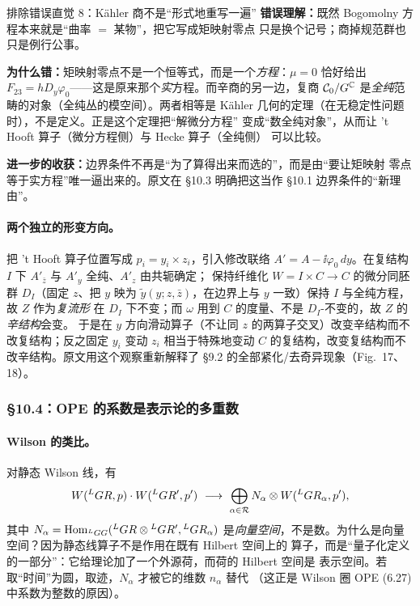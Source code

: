 \begin{kcard}{排除错误直觉 8：Kähler 商不是“形式地重写一遍”}
\textbf{错误理解：}既然 Bogomolny 方程本来就是“曲率 $=$ 某物”，把它写成矩映射零点
只是换个记号；商掉规范群也只是例行公事。

\textbf{为什么错：}矩映射零点不是一个恒等式，而是一个\emph{方程}：$\mu=0$ 恰好给出
$F_{23}=hD_y\varphi_0$——这是原来那个\emph{实}方程。而辛商的另一边，复商
$\mathcal{C}_0/G^{\mathbb{C}}$ 是\emph{全纯}范畴的对象（全纯丛的模空间）。两者相等是
Kähler 几何的定理（在无稳定性问题时），不是定义。正是这个定理把“解微分方程”
变成“数全纯对象”，从而让 't Hooft{} 算子（微分方程侧）与 Hecke 算子（全纯侧）
可以比较。\pA{}

\textbf{进一步的收获：}边界条件不再是“为了算得出来而选的”，而是由“要让矩映射
零点等于实方程”唯一逼出来的。原文在 §10.3 明确把这当作 §10.1 边界条件的“新理由”。
\end{kcard}

\paragraph{两个独立的形变方向。}把 't Hooft{} 算子位置写成 $p_i=y_i\times z_i$，引入修改联络
$A'=A-\ii\varphi_0\,dy$。在复结构 $I$ 下 $A'_{\bar z}$ 与 $A'_y$ 全纯、$A'_z$ 由共轭确定；
保持纤维化 $W=I\times C\to C$ 的微分同胚群 $D_I$（固定 $z$、把 $y$ 映为
$\tilde y(y;z,\bar z)$，在边界上与 $y$ 一致）保持 $I$ 与全纯方程，故 $Z$ 作为\emph{复流形}
在 $D_I$ 下不变；而 $\omega$ 用到 $C$ 的度量、不是 $D_I$-不变的，故 $Z$ 的\emph{辛结构}会变。
于是在 $y$ 方向滑动算子（不让同 $z$ 的两算子交叉）改变辛结构而不改复结构；反之固定 $y_i$
变动 $z_i$ 相当于特殊地变动 $C$ 的复结构，改变复结构而不改辛结构。原文用这个观察重新解释了
§9.2 的全部紧化/去奇异现象（Fig.~17、18）。\pA{}

\subsubsection{§10.4：OPE 的系数是表示论的多重数}

\paragraph{Wilson 的类比。}对静态 Wilson 线，有
\begin{equation}
W({}^{L}G R,p)\cdot W({}^{L}G R',p')\ \longrightarrow\
\bigoplus_{\alpha\in\mathcal{R}}N_\alpha\otimes W({}^{L}G R_\alpha,p'),
\label{eq:opeW}
\end{equation}
其中 $N_\alpha=\mathrm{Hom}_{{}^{L}G G}({}^{L}G R\otimes{}^{L}G R',{}^{L}G R_\alpha)$
是\emph{向量空间}，不是数。为什么是向量空间？因为静态线算子不是作用在既有 Hilbert 空间上的
算子，而是“量子化定义的一部分”：它给理论加了一个外源荷，而荷的 Hilbert 空间是
表示空间。若取“时间”为圆，取迹，$N_\alpha$ 才被它的维数 $n_\alpha$ 替代
（这正是 Wilson 圈 OPE (6.27) 中系数为整数的原因）。\pA{}

